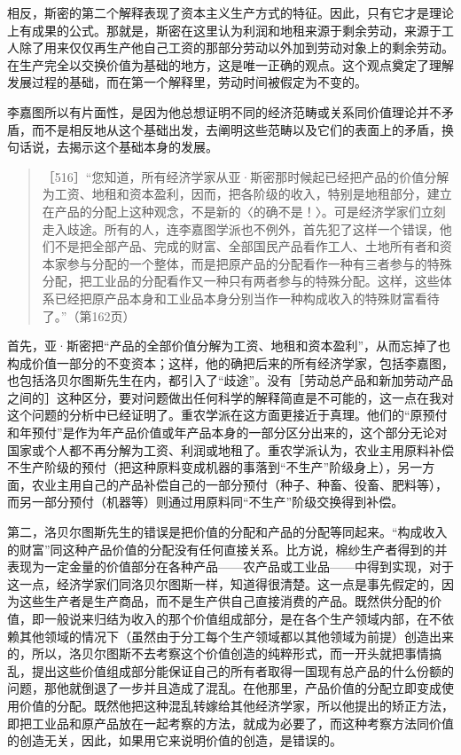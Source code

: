 相反，斯密的第二个解释表现了资本主义生产方式的特征。因此，只有它才是理论上有成果的公式。那就是，斯密在这里认为利润和地租来源于剩余劳动，来源于工人除了用来仅仅再生产他自己工资的那部分劳动以外加到劳动对象上的剩余劳动。在生产完全以交换价值为基础的地方，这是唯一正确的观点。这个观点奠定了理解发展过程的基础，而在第一个解释里，劳动时间被假定为不变的。

李嘉图所以有片面性，是因为他总想证明不同的经济范畴或关系同价值理论并不矛盾，而不是相反地从这个基础出发，去阐明这些范畴以及它们的表面上的矛盾，换句话说，去揭示这个基础本身的发展。

\begin{quote}{［516］“您知道，所有经济学家从亚·斯密那时候起已经把产品的价值分解为工资、地租和资本盈利，因而，把各阶级的收入，特别是地租部分，建立在产品的分配上这种观念，不是新的〈的确不是！〉。可是经济学家们立刻走入歧途。所有的人，连李嘉图学派也不例外，首先犯了这样一个错误，他们不是把全部产品、完成的财富、全部国民产品看作工人、土地所有者和资本家参与分配的一个整体，而是把原产品的分配看作一种有三者参与的特殊分配，把工业品的分配看作又一种只有两者参与的特殊分配。这样，这些体系已经把原产品本身和工业品本身分别当作一种构成收入的特殊财富看待了。”（第162页）}\end{quote}

首先，亚·斯密把“产品的全部价值分解为工资、地租和资本盈利”，从而忘掉了也构成价值一部分的不变资本；这样，他的确把后来的所有经济学家，包括李嘉图，也包括洛贝尔图斯先生在内，都引入了“歧途”。没有［劳动总产品和新加劳动产品之间的］这种区分，要对问题做出任何科学的解释简直是不可能的，这一点在我对这个问题的分析中已经证明了。重农学派在这方面更接近于真理。他们的“原预付和年预付”是作为年产品价值或年产品本身的一部分区分出来的，这个部分无论对国家或个人都不再分解为工资、利润或地租了。重农学派认为，农业主用原料补偿不生产阶级的预付（把这种原料变成机器的事落到“不生产”阶级身上），另一方面，农业主用自己的产品补偿自己的一部分预付（种子、种畜、役畜、肥料等），而另一部分预付（机器等）则通过用原料同“不生产”阶级交换得到补偿。

第二，洛贝尔图斯先生的错误是把价值的分配和产品的分配等同起来。“构成收入的财富”同这种产品价值的分配没有任何直接关系。比方说，棉纱生产者得到的并表现为一定金量的价值部分在各种产品——农产品或工业品——中得到实现，对于这一点，经济学家们同洛贝尔图斯一样，知道得很清楚。这一点是事先假定的，因为这些生产者是生产商品，而不是生产供自己直接消费的产品。既然供分配的价值，即一般说来归结为收入的那个价值组成部分，是在各个生产领域内部，在不依赖其他领域的情况下（虽然由于分工每个生产领域都以其他领域为前提）创造出来的，所以，洛贝尔图斯不去考察这个价值创造的纯粹形式，而一开头就把事情搞乱，提出这些价值组成部分能保证自己的所有者取得一国现有总产品的什么份额的问题，那他就倒退了一步并且造成了混乱。在他那里，产品价值的分配立即变成使用价值的分配。既然他把这种混乱转嫁给其他经济学家，所以他提出的矫正方法，即把工业品和原产品放在一起考察的方法，就成为必要了，而这种考察方法同价值的创造无关，因此，如果用它来说明价值的创造，是错误的。

